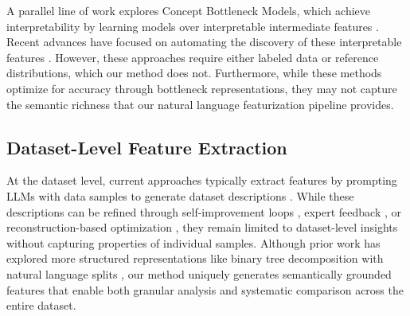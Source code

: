A parallel line of work explores Concept Bottleneck Models, which achieve interpretability by learning models over interpretable intermediate features \cite{koh2020concept}. Recent advances have focused on automating the discovery of these interpretable features \cite{yang2023language, ludan2023interpretable, schrodi2024concept}. However, these approaches require either labeled data or reference distributions, which our method does not. Furthermore, while these methods optimize for accuracy through bottleneck representations, they may not capture the semantic richness that our natural language featurization pipeline provides.

\subsection{Dataset-Level Feature Extraction}

At the dataset level, current approaches typically extract features by prompting LLMs with data samples to generate dataset descriptions \citep{singh2024rethinking}. While these descriptions can be refined through self-improvement loops \citep{pan2023automatically, gero2023self}, expert feedback \citep{templeton2024scaling}, or reconstruction-based optimization \citep{singh2024iprompt}, they remain limited to dataset-level insights without capturing properties of individual samples. Although prior work has explored more structured representations like binary tree decomposition with natural language splits \citep{singh2023tree}, our method uniquely generates semantically grounded features that enable both granular analysis and systematic comparison across the entire dataset.